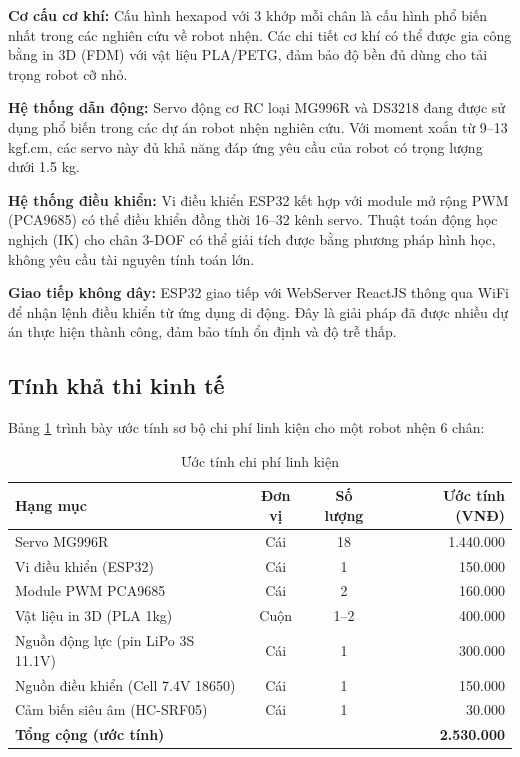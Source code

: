         \textbf{Cơ cấu cơ khí:} Cấu hình hexapod với 3 khớp mỗi chân là cấu hình phổ biến nhất trong các nghiên cứu về robot nhện. Các chi tiết cơ khí có thể được gia công bằng in 3D (FDM) với vật liệu PLA/PETG, đảm bảo độ bền đủ dùng cho tải trọng robot cỡ nhỏ.

        \textbf{Hệ thống dẫn động:} Servo động cơ RC loại MG996R và DS3218 đang được sử dụng phổ biến trong các dự án robot nhện nghiên cứu. Với moment xoắn từ 9--13 kgf.cm, các servo này đủ khả năng đáp ứng yêu cầu của robot có trọng lượng dưới 1.5 kg.

        \textbf{Hệ thống điều khiển:} Vi điều khiển ESP32 kết hợp với module mở rộng PWM (PCA9685) có thể điều khiển đồng thời 16--32 kênh servo. Thuật toán động học nghịch (IK) cho chân 3-DOF có thể giải tích được bằng phương pháp hình học, không yêu cầu tài nguyên tính toán lớn.

        \textbf{Giao tiếp không dây:} ESP32 giao tiếp với WebServer ReactJS thông qua WiFi để nhận lệnh điều khiển từ ứng dụng di động. Đây là giải pháp đã được nhiều dự án thực hiện thành công, đảm bảo tính ổn định và độ trễ thấp.

        \subsection{Tính khả thi kinh tế}

        \hspace{0.5cm} Bảng \ref{tab:cost_estimate} trình bày ước tính sơ bộ chi phí linh kiện cho một robot nhện 6 chân:

        \begin{table}[h!]
        \centering
        \caption{Ước tính chi phí linh kiện}
        \label{tab:cost_estimate}
        \begin{tabular}{|l|c|c|r|}
        \hline
        \textbf{Hạng mục} & \textbf{Đơn vị} & \textbf{Số lượng} & \textbf{Ước tính (VNĐ)} \\
        \hline
        Servo MG996R & Cái & 18 & 1.440.000 \\
        Vi điều khiển (ESP32) & Cái & 1 & 150.000 \\
        Module PWM PCA9685 & Cái & 2 & 160.000 \\
        Vật liệu in 3D (PLA 1kg) & Cuộn & 1--2 & 400.000 \\
        Nguồn động lực (pin LiPo 3S 11.1V) & Cái & 1 & 300.000 \\
        Nguồn điều khiển (Cell 7.4V 18650) & Cái & 1 & 150.000 \\
        Cảm biến siêu âm (HC-SRF05) & Cái & 1 & 30.000 \\
        \hline
        \textbf{Tổng cộng (ước tính)} & & & \textbf{~2.530.000} \\
        \hline
        \end{tabular}
        \end{table}

